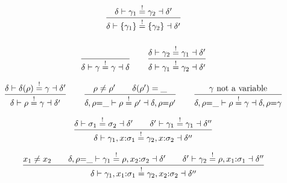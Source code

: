 \documentclass[10pt,a4paper]{article}
\renewcommand\vec[1]{\overline{#1}}
\begin{document}
$$
\frac{
  \delta \vdash \gamma_1 \stackrel!= \gamma_2 \dashv \delta'
}{
  \delta \vdash \{\gamma_1\} \stackrel!= \{\gamma_2\} \dashv \delta'
}
$$


\subsubsection*{}
\vspace{-2\baselineskip}

$$
\frac{
}{
  \delta \vdash \gamma \stackrel!= \gamma \dashv \delta
}
\qquad
\frac{
  \delta \vdash \gamma_2 \stackrel!= \gamma_1 \dashv \delta'
}{
  \delta \vdash \gamma_1 \stackrel!= \gamma_2 \dashv \delta'
}
$$

$$
\frac{
  \delta \vdash \delta(\rho) \stackrel!= \gamma \dashv \delta'
}{
  \delta \vdash \rho \stackrel!= \gamma \dashv \delta'
}
\qquad
\frac{
  \rho \neq \rho'
  \qquad
  \delta(\rho') = \_
}{
  \delta,\rho{=}\_ \vdash \rho \stackrel!= \rho' \dashv \delta,\rho{=}\rho'
}
\qquad
\frac{
  \gamma ~\mbox{not a variable}
}{
  \delta,\rho{=}\_ \vdash \rho \stackrel!= \gamma \dashv \delta,\rho{=}\gamma
}
$$


$$
\frac{
  \delta \vdash \sigma_1 \stackrel!= \sigma_2 \dashv \delta'
  \qquad
  \delta' \vdash \gamma_1 \stackrel!= \gamma_1 \dashv \delta''
}{
  \delta \vdash \gamma_1,x{:}\sigma_1 \stackrel!= \gamma_2,x{:}\sigma_2 \dashv \delta''
}
$$

$$
\frac{
  x_1 \neq x_2
  \qquad
  \delta,\rho{=}\_ \vdash \gamma_1 \stackrel!= \rho,x_2{:}\sigma_2 \dashv \delta'
  \qquad
  \delta' \vdash \gamma_2 \stackrel!= \rho,x_1{:}\sigma_1 \dashv \delta''
}{
  \delta \vdash \gamma_1,x_1{:}\sigma_1 \stackrel!= \gamma_2,x_2{:}\sigma_2 \dashv \delta''
}
$$
\end{document}

